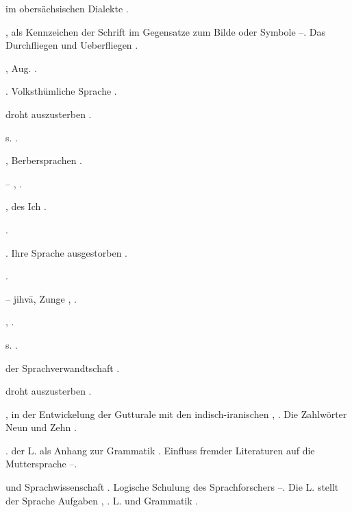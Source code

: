 \begin{register}
 im obersächsischen Dialekte \pageref{sp.316}.


, als Kennzeichen der Schrift im Gegensatze zum Bilde oder Symbole \pageref{sp.128}–\pageref{sp.129}. Das Durchfliegen und Ueberfliegen \pageref{sp.433}.

, Aug. \pageref{sp.254}.

. Volksthümliche Sprache \pageref{sp.46}\sed{, \pageref{sp.438}}.

 droht auszusterben \pageref{sp.146}.


 s. .

, Berbersprachen \pageref{sp.282}.

– \pageref{sp.122}, \pageref{sp.437}.

,  des Ich \pageref{sp.307}.

 \pageref{sp.280}.

. Ihre Sprache ausgestorben \pageref{sp.146}.

 \pageref{sp.287}.

 – jihvā, Zunge \pageref{sp.186}, \pageref{sp.217}.

 \pageref{sp.174}, \pageref{sp.183}.


 s. .

 der Sprachverwandtschaft \pageref{sp.145}.

 droht auszusterben \pageref{sp.146}.

,  in der Entwickelung der Gutturale mit den indisch-iranischen \pageref{sp.159}, \pageref{sp.163}. Die Zahlwörter Neun und Zehn \pageref{sp.401}.

.  der L. als Anhang zur Grammatik \pageref{sp.107}. Einfluss fremder Literaturen auf die Muttersprache \pageref{sp.274}–\pageref{sp.275}.


 und Sprachwissenschaft \pageref{sp.14}. Logische Schulung des Sprachforschers \pageref{sp.47}–\pageref{sp.48}. Die L. stellt der Sprache Aufgaben \pageref{sp.48}, \pageref{sp.95}. L. und Grammatik \pageref{sp.448}.


\end{register}
